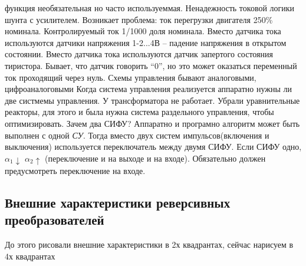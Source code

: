 функция необязательная но часто используеммая. Ненадежность токовой логики
шунта с усилителем. Возникает проблема: ток перегрузки двигателя 250\% номинала.
Контролируемый ток 1/1000 доля номинала. Вместо датчика тока используются датчики
напряжения 1-2...4В -- падение напряжения в открытом состоянии.
Вместо датчика тока используются датчик запертого состояния тиристора.
Бывает, что датчик говорить ``0'', но это может оказаться переменный ток проходящий
через нуль. Схемы управления бывают аналоговыми, цифроаналоговыми
Когда система управления реализуется аппаратно нужны ли две систмемы управления.
У трансформатора не работает. Убрали уравнительные реакторы, для этого и была нужна
система раздельного управления, чтобы оптимизировать.
Зачем два СИФУ? Аппаратно и програмно алгоритм может быть выполнен с одной
{\it СУ}. Тогда вместо двух систем импульсов(включения и выключения) используется
переключатель между двумя СИФУ. Если СИФУ одно, $\alpha_1\downarrow$
$\alpha_2\uparrow$ (переключение и на выходе и на входе). Обязательно должен
предусмотреть переключение на входе.

\subsection{Внешние характеристики реверсивных преобразователей}
До этого рисовали внешние характеристики в 2х квадрантах, сейчас нарисуем в
4х квадрантах

